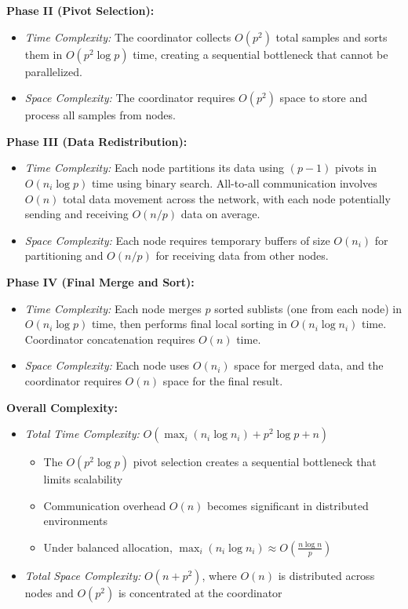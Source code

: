 \documentclass[]{interact}
\theoremstyle{plain}
\theoremstyle{definition}
\theoremstyle{remark}
\begin{document}
\textbf{Phase II (Pivot Selection):}
\begin{itemize}
\item \textit{Time Complexity:} The coordinator collects $O(p^2)$ total samples and sorts them in $O(p^2 \log p)$ time, creating a sequential bottleneck that cannot be parallelized.
\item \textit{Space Complexity:} The coordinator requires $O(p^2)$ space to store and process all samples from nodes.
\end{itemize}

\textbf{Phase III (Data Redistribution):}
\begin{itemize}
\item \textit{Time Complexity:} Each node partitions its data using $(p-1)$ pivots in $O(n_i \log p)$ time using binary search. All-to-all communication involves $O(n)$ total data movement across the network, with each node potentially sending and receiving $O(n/p)$ data on average.
\item \textit{Space Complexity:} Each node requires temporary buffers of size $O(n_i)$ for partitioning and $O(n/p)$ for receiving data from other nodes.
\end{itemize}

\textbf{Phase IV (Final Merge and Sort):}
\begin{itemize}
\item \textit{Time Complexity:} Each node merges $p$ sorted sublists (one from each node) in $O(n_i \log p)$ time, then performs final local sorting in $O(n_i \log n_i)$ time. Coordinator concatenation requires $O(n)$ time.
\item \textit{Space Complexity:} Each node uses $O(n_i)$ space for merged data, and the coordinator requires $O(n)$ space for the final result.
\end{itemize}

\textbf{Overall Complexity:}
\begin{itemize}
\item \textit{Total Time Complexity:} $O(\max_i(n_i \log n_i) + p^2 \log p + n)$
\begin{itemize}
\item The $O(p^2 \log p)$ pivot selection creates a sequential bottleneck that limits scalability
\item Communication overhead $O(n)$ becomes significant in distributed environments
\item Under balanced allocation, $\max_i(n_i \log n_i) \approx O(\frac{n \log n}{p})$
\end{itemize}
\item \textit{Total Space Complexity:} $O(n + p^2)$, where $O(n)$ is distributed across nodes and $O(p^2)$ is concentrated at the coordinator
\end{itemize}
\end{document}
